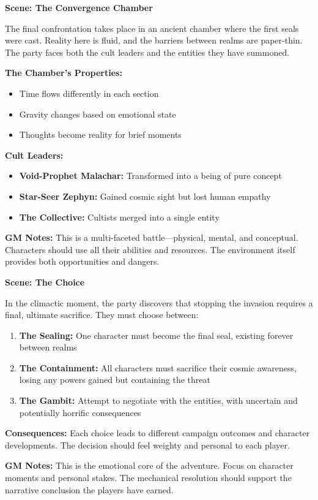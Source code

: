 \documentclass[12pt,twoside]{article}
\newenvironment{scene}[1]{%
  \vspace{0.5cm}
  \begin{center}
    \textbf{\large Scene: #1}
  \end{center}
  \vspace{0.3cm}
}{}
\begin{document}
\begin{scene}{The Convergence Chamber}
The final confrontation takes place in an ancient chamber where the first seals were cast. Reality here is fluid, and the barriers between realms are paper-thin. The party faces both the cult leaders and the entities they have summoned.

\textbf{The Chamber's Properties:}
\begin{itemize}[leftmargin=*]
\item Time flows differently in each section
\item Gravity changes based on emotional state
\item Thoughts become reality for brief moments
\end{itemize}

\textbf{Cult Leaders:}
\begin{itemize}[leftmargin=*]
\item \textbf{Void-Prophet Malachar:} Transformed into a being of pure concept
\item \textbf{Star-Seer Zephyn:} Gained cosmic sight but lost human empathy
\item \textbf{The Collective:} Cultists merged into a single entity
\end{itemize}

\textbf{GM Notes:} This is a multi-faceted battle---physical, mental, and conceptual. Characters should use all their abilities and resources. The environment itself provides both opportunities and dangers.
\end{scene}

\begin{scene}{The Choice}
In the climactic moment, the party discovers that stopping the invasion requires a final, ultimate sacrifice. They must choose between:

\begin{enumerate}[leftmargin=*]
\item \textbf{The Sealing:} One character must become the final seal, existing forever between realms
\item \textbf{The Containment:} All characters must sacrifice their cosmic awareness, losing any powers gained but containing the threat
\item \textbf{The Gambit:} Attempt to negotiate with the entities, with uncertain and potentially horrific consequences
\end{enumerate}

\textbf{Consequences:} Each choice leads to different campaign outcomes and character developments. The decision should feel weighty and personal to each player.

\textbf{GM Notes:} This is the emotional core of the adventure. Focus on character moments and personal stakes. The mechanical resolution should support the narrative conclusion the players have earned.
\end{scene}
\end{document}
